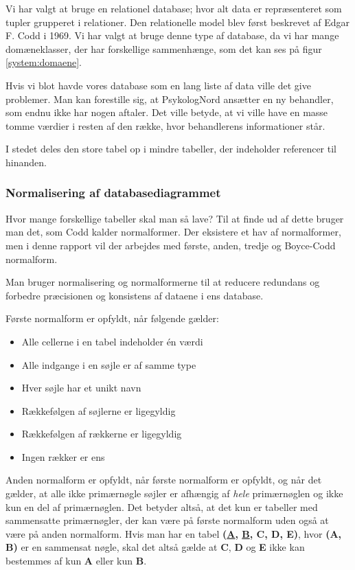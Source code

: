 Vi har valgt at bruge en relationel database; hvor alt data er repræsenteret som tupler grupperet i relationer.
Den relationelle model blev først beskrevet af Edgar F. Codd i 1969.
Vi har valgt at bruge denne type af database, da vi har mange domæneklasser, der har forskellige sammenhænge, som det kan ses på figur \ref{system:domaene}.

Hvis vi blot havde vores database som en lang liste af data ville det give problemer.
Man kan forestille sig, at PsykologNord ansætter en ny behandler, som endnu ikke har nogen aftaler.
Det ville betyde, at vi ville have en masse tomme værdier i resten af den række, hvor behandlerens informationer står.\cite{database}

I stedet deles den store tabel op i mindre tabeller, der indeholder referencer til hinanden.

\subsubsection{Normalisering af databasediagrammet}

Hvor mange forskellige tabeller skal man så lave? Til at finde ud af dette bruger man det, som Codd kalder normalformer.
Der eksistere et hav af normalformer, men i denne rapport vil der arbejdes med første, anden, tredje og Boyce-Codd normalform.

Man bruger normalisering og normalformerne til at reducere redundans og forbedre præcisionen og konsistens af dataene i ens database.

Første normalform er opfyldt, når følgende gælder:
\begin{itemize}
    \item Alle cellerne i en tabel indeholder én værdi
    \item Alle indgange i en søjle er af samme type
    \item Hver søjle har et unikt navn
    \item Rækkefølgen af søjlerne er ligegyldig
    \item Rækkefølgen af rækkerne er ligegyldig
    \item Ingen rækker er ens
\end{itemize}

Anden normalform er opfyldt, når første normalform er opfyldt, og når det gælder, at alle ikke primærnøgle søjler er afhængig af \textit{hele} primærnøglen og ikke kun en del af primærnøglen.
Det betyder altså, at det kun er tabeller med sammensatte primærnøgler, der kan være på første normalform uden også at være på anden normalform. Hvis man har en tabel \textbf{(\underline{A}, \underline{B}, C, D, E)}, hvor \textbf{(A, B)} er en sammensat nøgle, skal det altså gælde at \textbf{C}, \textbf{D} og \textbf{E} ikke kan bestemmes af kun \textbf{A} eller kun \textbf{B}.

